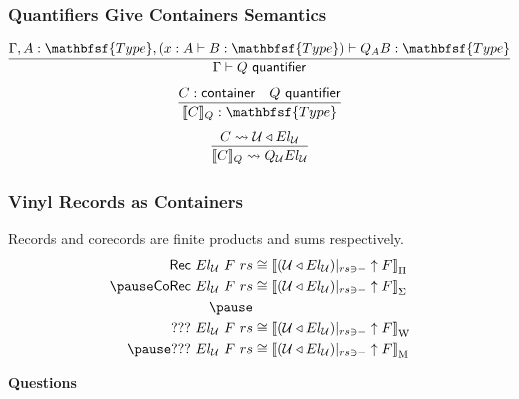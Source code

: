 \documentclass[12pt]{beamer}
\def\Type{\mathbfsf{Type}}
\begin{document}
\begin{frame}
  \frametitle{Quantifiers Give Containers Semantics}
  \[
    \infer{\Gamma\vdash Q\ \mathsf{quantifier}}{
      \Gamma,A:\Type, (x:A\vdash B:\Type) \vdash Q_AB:\Type
    }
  \]\pause
  \[
    \infer{\llbracket C\rrbracket_Q : \Type}{
      C : \container &
      Q\ \mathsf{quantifier}
    }
  \]\pause
  \[
    \infer{
      \llbracket C\rrbracket_Q \leadsto Q_\mathcal{U} El_\mathcal{U}
    }{
      C \leadsto \mkcon{\mathcal{U}}{El_\mathcal{U}}
    }
  \]
\end{frame}

\begin{frame}
  \frametitle{Vinyl Records as Containers}\pause
  Records and corecords are finite products and sums respectively.\pause
  \[
    \begin{aligned}
      \mathsf{Rec}\ El_\mathcal{U}\ F\ rs
        &\cong \left\llbracket (\mkcon{\mathcal{U}}{El_\mathcal{U}})|_{rs\ni-}\uparrow F \right\rrbracket_\Pi\\ \pause
      \mathsf{CoRec}\ El_\mathcal{U}\ F\ rs
        &\cong \left\llbracket (\mkcon{\mathcal{U}}{El_\mathcal{U}})|_{rs\ni-}\uparrow F \right\rrbracket_\Sigma\\ \pause
      \\
      ???\ El_\mathcal{U}\ F\ rs
        &\cong \left\llbracket (\mkcon{\mathcal{U}}{El_\mathcal{U}})|_{rs\ni-}\uparrow F \right\rrbracket_\mathrm{W}\\ \pause
      ???\ El_\mathcal{U}\ F\ rs
        &\cong \left\llbracket (\mkcon{\mathcal{U}}{El_\mathcal{U}})|_{rs\ni-}\uparrow F \right\rrbracket_\mathrm{M}
    \end{aligned}
  \]
\end{frame}

\begin{frame}
  \centerline{\textbf{Questions}}
\end{frame}
\end{document}
